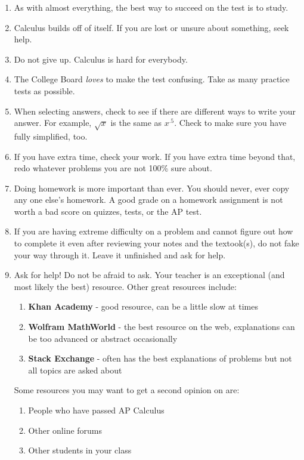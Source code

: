 \documentclass[../revisedmain.tex]{subfiles}
\begin{document}
	\begin{enumerate}
		\item As with almost everything, the best way to succeed on the test is to study.
		\item Calculus builds off of itself. If you are lost or unsure about something, seek help.
		\item Do not give up. Calculus is hard for everybody.
		\item The College Board \textit{loves} to make the test confusing. Take as many practice tests as possible.
		\item When selecting answers, check to see if there are different ways to write your answer. For example, \(\sqrt{x}\) is the same as \(x^{.5}\). Check to make sure you have fully simplified, too.
		\item If you have extra time, check your work. If you have extra time beyond that, redo whatever problems you are not 100\% sure about.
		\item Doing homework is more important than ever. You should never, ever copy any one else's homework. A good grade on a homework assignment is not worth a bad score on quizzes, tests, or the AP test.
		\item If you are having extreme difficulty on a problem and cannot figure out how to complete it even after reviewing your notes and the textook(s), do not fake your way through it. Leave it unfinished and ask for help.
		\item Ask for help! Do not be afraid to ask. Your teacher is an exceptional (and most likely the best) resource. Other great resources include:
		\begin{enumerate}
			\item \textbf{Khan Academy} - good resource, can be a little slow at times
			\item \textbf{Wolfram MathWorld} - the best resource on the web, explanations can be too advanced or abstract occasionally
			\item \textbf{Stack Exchange} - often has the best explanations of problems but not all topics are asked about
		\end{enumerate}
		Some resources you may want to get a second opinion on are:
		\begin{enumerate}
			\item People who have passed AP Calculus
			\item Other online forums
			\item Other students in your class
		\end{enumerate}
	\end{enumerate}
\end{document}
